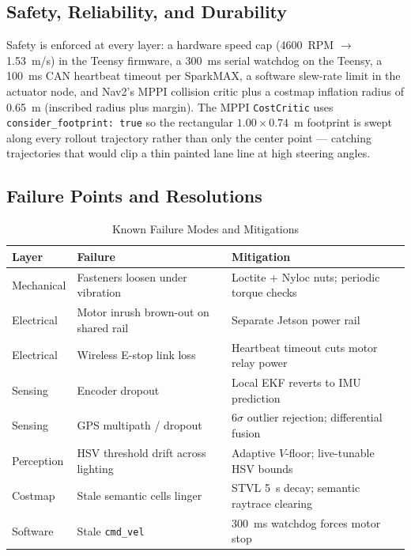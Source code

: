 \documentclass[11pt, letterpaper]{article}
\begin{document}
\subsection{Safety, Reliability, and Durability}

Safety is enforced at every layer: a hardware speed cap (4600~RPM $\to$ 1.53~m/s) in the
Teensy firmware, a 300~ms serial watchdog on the Teensy, a 100~ms CAN heartbeat timeout
per SparkMAX, a software slew-rate limit in the actuator node, and Nav2's MPPI collision
critic plus a costmap inflation radius of 0.65~m (inscribed radius plus margin). The MPPI
\texttt{CostCritic} uses \texttt{consider\_footprint: true} so the rectangular
$1.00 \times 0.74$~m footprint is swept along every rollout trajectory rather than only
the center point --- catching trajectories that would clip a thin painted lane line at
high steering angles.

\subsection{Failure Points and Resolutions}

\begin{table}[H]
    \centering
    \small
    \caption{Known Failure Modes and Mitigations}
    \begin{tabularx}{\textwidth}{l X X}
        \toprule
        \textbf{Layer} & \textbf{Failure} & \textbf{Mitigation} \\
        \midrule
        Mechanical & Fasteners loosen under vibration & Loctite + Nyloc nuts; periodic torque checks \\
        Electrical & Motor inrush brown-out on shared rail & Separate Jetson power rail \\
        Electrical & Wireless E-stop link loss & Heartbeat timeout cuts motor relay power \\
        Sensing & Encoder dropout & Local EKF reverts to IMU prediction \\
        Sensing & GPS multipath / dropout & 6$\sigma$ outlier rejection; differential fusion \\
        Perception & HSV threshold drift across lighting & Adaptive $V$-floor; live-tunable HSV bounds \\
        Costmap & Stale semantic cells linger & STVL 5~s decay; semantic raytrace clearing \\
        Software & Stale \texttt{cmd\_vel} & 300~ms watchdog forces motor stop \\
        \bottomrule
    \end{tabularx}
\end{table}
\end{document}
